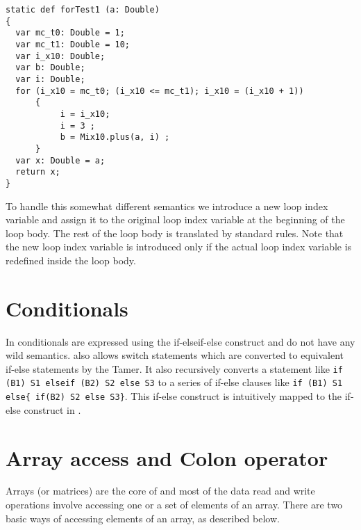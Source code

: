 \begin{lstlisting}[language=X10,numbers=none]
static def forTest1 (a: Double)
{
  var mc_t0: Double = 1;
  var mc_t1: Double = 10;
  var i_x10: Double;
  var b: Double;
  var i: Double;
  for (i_x10 = mc_t0; (i_x10 <= mc_t1); i_x10 = (i_x10 + 1))
      {   
           i = i_x10;
           i = 3 ;
           b = Mix10.plus(a, i) ;
      }
  var x: Double = a;
  return x;
}
\end{lstlisting}

To handle this somewhat different semantics we introduce a new loop
index variable and assign it to the original loop index variable at the
beginning of the loop body. The rest of the loop body is translated by
standard rules.  Note that the new loop index variable is
introduced only if the actual loop index variable is redefined inside
the loop body. 

\section{Conditionals}

In \matlab conditionals are expressed using the if-elseif-else construct
and do not have any wild semantics. \matlab also allows switch
statements which are converted to equivalent if-else statements by the
Tamer. It also recursively converts a statement like 
\verb|if (B1) S1 elseif (B2) S2 else S3| to a series of if-else clauses like 
\verb|if (B1) S1 else{ if(B2) S2 else S3}|. This if-else construct is 
intuitively mapped to the if-else construct in \xten. 


\section{Array access and Colon operator}

Arrays (or matrices) are the core of \matlab and most of the data read and
write operations involve accessing one or a set of elements of an array. There
are two basic ways of accessing elements of an array, as described below.


